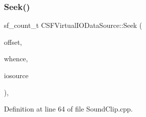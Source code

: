 \subsubsection{\texorpdfstring{Seek()}{Seek()}}
{\footnotesize\ttfamily sf\+\_\+count\+\_\+t C\+S\+F\+Virtual\+I\+O\+Data\+Source\+::\+Seek (\begin{DoxyParamCaption}\item[{sf\+\_\+count\+\_\+t}]{offset,  }\item[{int}]{whence,  }\item[{\hyperlink{classCSFVirtualIODataSource}{C\+S\+F\+Virtual\+I\+O\+Data\+Source} $\ast$}]{iosource }\end{DoxyParamCaption})\hspace{0.3cm}{\ttfamily [static]}, {\ttfamily [protected]}}



Definition at line 64 of file Sound\+Clip.\+cpp.


